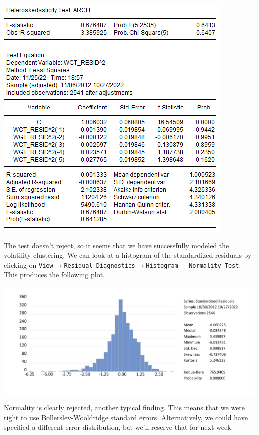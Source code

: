 \documentclass[11pt, a4paper]{article}
\begin{document}
\begin{enumerate}
\begin{enumerate}
\begin{center}
\includegraphics[width=.6\textwidth]{archlmresides}
\end{center}
The test doesn't reject, so it seems that we have successfully modeled the volatility clustering. We can look at a histogram of the standardized residuals by clicking on \texttt{View$\rightarrow$Residual Diagnostics$\rightarrow$Histogram - Normality Test}. This produces the following plot.
\begin{center}
\includegraphics[width=.8\textwidth]{hist}
\end{center}
Normality is clearly rejected, another typical finding. This means that we  were right to use Bollerslev-Wooldridge standard errors. Alternatively, we could have specified a different error distribution, but we'll reserve that for next week.


\end{enumerate}
\end{enumerate}
\end{document}
